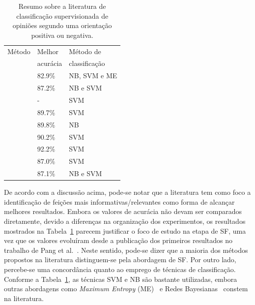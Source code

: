 \documentclass[11pt,a4paper]{article}
\begin{document}
 \begin{table}[h]
\caption{Resumo sobre a literatura de classificação supervisionada de opiniões segundo uma orientação positiva ou negativa.} \label{tab:best-accuracies}
\begin{center}
    \begin{tabular}{l l l}
    \hline
    Método                             & Melhor     & Método de      \\
                                       & acurácia   & classificação      \\ \hline
    \small \cite{Pang02:ThumbsUp}      & 82.9\%     & NB, SVM e ME \\
    \small \cite{Pang04:Subjectivity}  & 87.2\%     & NB e SVM         \\
    \small \cite{Dang:Lexicon}         & -          & SVM    \\
    \small \cite{abbasi:IFS}           & 89.7\%     & SVM         \\
    \small \cite{Raychev:Language}     & 89.8\%     & NB  \\
    \small \cite{Whitelaw:Appraisal}   & 90.2\%     & SVM \\
    \small \cite{Zaidan:Rationales}    & 92.2\%     & SVM \\
    \small \cite{Li:Framework}         & 87.0\%     & SVM \\
    \small \cite{OKeefe:Weighting}     & 87.1\%     & NB e SVM\\
    \hline
    \end{tabular}
\end{center}
\end{table}

 De acordo com a discussão acima, pode-se notar que a literatura tem como foco a identificação de feições mais informativas/relevantes como forma de alcançar melhores resultados. Embora os valores de acurácia não devam ser comparados diretamente, devido a diferenças na organização dos experimentos, os resultados mostrados na Tabela~\ref{tab:best-accuracies} parecem justificar o foco de estudo na etapa de SF, uma vez que os valores evoluíram desde a publicação dos primeiros resultados no trabalho de Pang et al.~\cite{Pang02:ThumbsUp}. Neste sentido, pode-se dizer que a maioria dos métodos propostos na literatura distinguem-se pela abordagem de SF. Por outro lado, percebe-se uma concordância quanto ao emprego de técnicas de classificação. Conforme a Tabela~\ref{tab:best-accuracies}, as técnicas SVM e NB são bastante utilizadas, embora outras abordagens como \textit{Maximum Entropy} (ME)~\cite{Pang02:ThumbsUp} e Redes Bayesianas~\cite{Bai:Predicting} constem na literatura.
\end{document}

